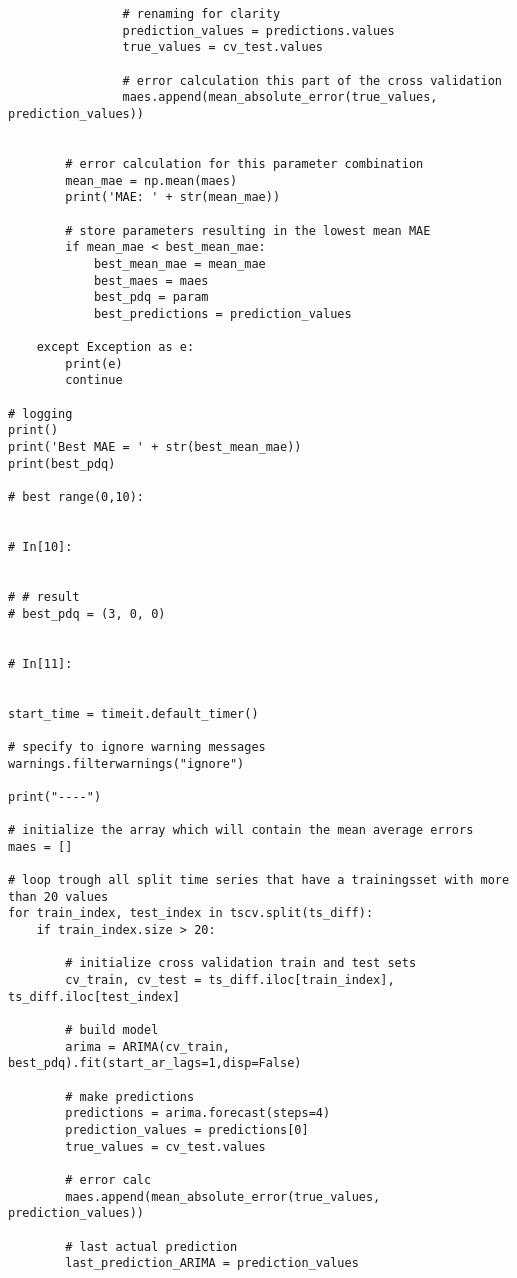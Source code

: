 \begin{verbatim}
                # renaming for clarity
                prediction_values = predictions.values
                true_values = cv_test.values
                
                # error calculation this part of the cross validation
                maes.append(mean_absolute_error(true_values, prediction_values))

        
        # error calculation for this parameter combination
        mean_mae = np.mean(maes)
        print('MAE: ' + str(mean_mae))    

        # store parameters resulting in the lowest mean MAE
        if mean_mae < best_mean_mae:
            best_mean_mae = mean_mae
            best_maes = maes
            best_pdq = param
            best_predictions = prediction_values
            
    except Exception as e:
        print(e)
        continue

# logging
print()
print('Best MAE = ' + str(best_mean_mae))
print(best_pdq)

# best range(0,10): 


# In[10]:


# # result
# best_pdq = (3, 0, 0)


# In[11]:


start_time = timeit.default_timer()

# specify to ignore warning messages
warnings.filterwarnings("ignore") 

print("----")

# initialize the array which will contain the mean average errors
maes = []

# loop trough all split time series that have a trainingsset with more than 20 values
for train_index, test_index in tscv.split(ts_diff):
    if train_index.size > 20:

        # initialize cross validation train and test sets
        cv_train, cv_test = ts_diff.iloc[train_index], ts_diff.iloc[test_index]

        # build model
        arima = ARIMA(cv_train, best_pdq).fit(start_ar_lags=1,disp=False)

        # make predictions
        predictions = arima.forecast(steps=4)
        prediction_values = predictions[0]
        true_values = cv_test.values

        # error calc
        maes.append(mean_absolute_error(true_values, prediction_values))

        # last actual prediction 
        last_prediction_ARIMA = prediction_values


\end{verbatim}
